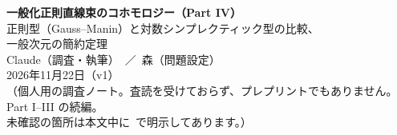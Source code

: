 

\sloppy
\begin{center}
{\LARGE\bfseries\sffamily 一般化正則直線束のコホモロジー（Part IV）}\\[8pt]
{\large 正則型（Gauss--Manin）と対数シンプレクティック型の比較、\\一般次元の簡約定理}\\[12pt]
{\large Claude（調査・執筆）\ ／\ 森（問題設定）}\\[3pt]
2026年11月22日（v1）\\[3pt]
{\small （個人用の調査ノート。査読を受けておらず、プレプリントでもありません。Part I--III の続編。\\
未確認の箇所は本文中に\tQ\ で明示してあります。）}
\end{center}
\begin{abstract}\noindent
Part I--III は型が跳ぶ（対数シンプレクティック）場合を調べた。本稿は (1) 正則型（シンプレクティック葉をもつ平坦なファイバー束 $Y\to M\to X$）で一般化 Dolbeault コホモロジーを Gauss--Manin 平坦束で書き下し（定理 \ref{thm:L}：$\HH^k=\bigoplus_{a+b+j=k}H^a(X,\wedge^bT_X\otimes V^j\otimes G)$、Leray の二重複体と Deligne の Lefschetz の補題による）、(2) その系として、各次数 $k$ ごとの $m$ の多項式としての Riemann--Roch（系 \ref{cor:L}）と、Pal--Poddar の Serre 型消滅（Thm.\ 11.12）との対応を示し、(3) 型が跳ぶ場合との違いを「$d_1=[\sigma,\cdot]$ がほぼ完全か否か」すなわち「多項式 vs 周期的」として具体的な数値で対比し、(4) 一般次元の対数シンプレクティックな場合に、Part II の予想を「各層の商複体の非輪状性（GEN$'$）」の言い換えとして簡約する（定理 \ref{thm:R}：(GEN$'$) の下で $\HH^*\cong H^*(U;L_U)\oplus\C^{\#D_{(n)}}[-n]$）。(GEN$'$) の十分条件の一般の場合の証明と、2つの設定の統一的な枠組み（予想 \ref{conj:U}）は未解決である。
\end{abstract}


